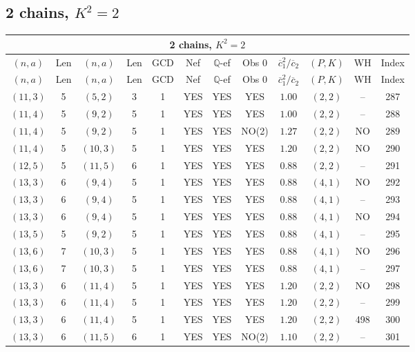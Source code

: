 \subsection{2 chains, $K^2 = 2$}
\begin{longtable}{|c|c|c|c|c|c|c|c|c|c|c|c|}
\hline
\multicolumn{12}{|c|}{2 chains, $K^2 = 2$}\\
\hline
$(n,a)$ & Len & $(n,a)$ & Len & GCD & Nef & $\mathbb Q$-ef & Obs 0 & $\overline c_1^2 / \overline c_2$ & $(P,K)$ & WH & Index\\
\hline
\endfirsthead

\hline
$(n,a)$ & Len & $(n,a)$ & Len & GCD & Nef & $\mathbb Q$-ef & Obs 0 & $\overline c_1^2 / \overline c_2$ & $(P,K)$ & WH & Index\\
\hline
\endhead
\hline
\endfoot

$(11,3)$ & 5 & $(5,2)$ & 3 & 1 & YES & YES & YES & $1.00$ & $(2,2)$ & -- & 287\\
$(11,4)$ & 5 & $(9,2)$ & 5 & 1 & YES & YES & YES & $1.00$ & $(2,2)$ & -- & 288\\
$(11,4)$ & 5 & $(9,2)$ & 5 & 1 & YES & YES & NO(2) & $1.27$ & $(2,2)$ & NO & 289\\
$(11,4)$ & 5 & $(10,3)$ & 5 & 1 & YES & YES & YES & $1.20$ & $(2,2)$ & NO & 290\\
$(12,5)$ & 5 & $(11,5)$ & 6 & 1 & YES & YES & YES & $0.88$ & $(2,2)$ & -- & 291\\
$(13,3)$ & 6 & $(9,4)$ & 5 & 1 & YES & YES & YES & $0.88$ & $(4,1)$ & NO & 292\\
$(13,3)$ & 6 & $(9,4)$ & 5 & 1 & YES & YES & YES & $0.88$ & $(4,1)$ & -- & 293\\
$(13,3)$ & 6 & $(9,4)$ & 5 & 1 & YES & YES & YES & $0.88$ & $(4,1)$ & NO & 294\\
$(13,5)$ & 5 & $(9,2)$ & 5 & 1 & YES & YES & YES & $0.88$ & $(4,1)$ & -- & 295\\
$(13,6)$ & 7 & $(10,3)$ & 5 & 1 & YES & YES & YES & $0.88$ & $(4,1)$ & NO & 296\\
$(13,6)$ & 7 & $(10,3)$ & 5 & 1 & YES & YES & YES & $0.88$ & $(4,1)$ & -- & 297\\
$(13,3)$ & 6 & $(11,4)$ & 5 & 1 & YES & YES & YES & $1.20$ & $(2,2)$ & NO & 298\\
$(13,3)$ & 6 & $(11,4)$ & 5 & 1 & YES & YES & YES & $1.20$ & $(2,2)$ & -- & 299\\
$(13,3)$ & 6 & $(11,4)$ & 5 & 1 & YES & YES & YES & $1.20$ & $(2,2)$ & 498 & 300\\
$(13,3)$ & 6 & $(11,5)$ & 6 & 1 & YES & YES & NO(2) & $1.10$ & $(2,2)$ & -- & 301\\

\end{longtable}
